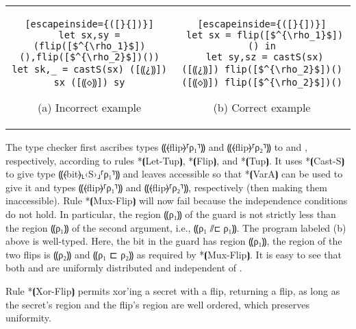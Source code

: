 \begin{center}
\begin{tabular}{cc}
\begin{minipage}{0.35\textwidth}
\begin{lstlisting}[escapeinside={([}{])}]
let sx,sy = (flip([$^{\rho_1}$])(),flip([$^{\rho_2}$])())
let sk,_ = castS(sx) ([⸨¿⸩]) sx ([⸨◇⸩]) sy
\end{lstlisting}
{\small (a) Incorrect example}
\end{minipage}
&
\begin{minipage}{0.45\textwidth}
\begin{lstlisting}[escapeinside={([}{])}]
 let sx = flip([$^{\rho_1}$])() in
 let sy,sz = castS(sx) ([⸨¿⸩]) flip([$^{\rho_2}$])() ([⸨◇⸩]) flip([$^{\rho_2}$])()
\end{lstlisting}
{\small (b) Correct example}
\end{minipage}
\end{tabular}
\end{center}
The type checker first ascribes types ⸨⦑flip⦒⸢{ρ₁}⸣⸩ and
⸨⦑flip⦒⸢{ρ₂}⸣⸩ to  and , respectively, according to
rules *⦗Let-Tup⦘, *⦗Flip⦘, and *⦗Tup⦘. It uses *⦗Cast-S⦘ to give
 type ⸨⦑bit⦒⸤‹S›⸥⸢{ρ₁}⸣⸩ and leaves 
accessible so that *⦗VarA⦘ can be used to give it and  types
⸨⦑flip⦒⸢{ρ₁}⸣⸩ and ⸨⦑flip⦒⸢{ρ₂}⸣⸩, respectively (then making them
inaccessible). Rule *⦗Mux-Flip⦘ will now fail because the independence
conditions do not hold. In particular, the region ⸨ρ₁⸩ of the
guard is not strictly less than the region ⸨ρ₁⸩ of the second
argument, i.e., ⸨ρ₁ ⫽⊏ ρ₁⸩.
%
The program labeled (b) above is well-typed.
Here, the bit in
the guard has region ⸨ρ₁⸩, the region of the two flips is ⸨ρ₂⸩ and ⸨ρ₁
⊏ ρ₂⸩ as required by *⦗Mux-Flip⦘. It is easy
to see that both  and
 are uniformly distributed and independent of .

Rule *⦗Xor-Flip⦘ permits xor'ing a secret with a flip, returning a
flip, as long as the secret's region and the flip's region are
well ordered, which preserves uniformity.


